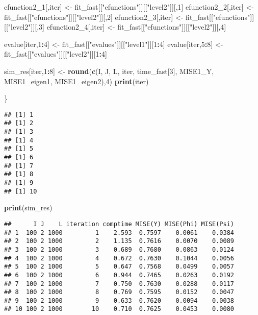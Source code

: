 \documentclass[
]{article}
\newenvironment{Shaded}{\begin{snugshade}}{\end{snugshade}}
\newcommand{\DecValTok}[1]{\textcolor[rgb]{0.00,0.00,0.81}{#1}}
\newcommand{\FunctionTok}[1]{\textcolor[rgb]{0.13,0.29,0.53}{\textbf{#1}}}
\newcommand{\NormalTok}[1]{#1}
\newcommand{\OtherTok}[1]{\textcolor[rgb]{0.56,0.35,0.01}{#1}}
\newcommand{\SpecialCharTok}[1]{\textcolor[rgb]{0.81,0.36,0.00}{\textbf{#1}}}
\newcommand{\StringTok}[1]{\textcolor[rgb]{0.31,0.60,0.02}{#1}}
\begin{document}
\begin{Shaded}
\begin{Highlighting}[]
\NormalTok{  efunction2\_1[,iter] }\OtherTok{\textless{}{-}}\NormalTok{ fit\_fast[[}\StringTok{"efunctions"}\NormalTok{]][[}\StringTok{"level2"}\NormalTok{]][,}\DecValTok{1}\NormalTok{]}
\NormalTok{  efunction2\_2[,iter] }\OtherTok{\textless{}{-}}\NormalTok{ fit\_fast[[}\StringTok{"efunctions"}\NormalTok{]][[}\StringTok{"level2"}\NormalTok{]][,}\DecValTok{2}\NormalTok{]}
\NormalTok{  efunction2\_3[,iter] }\OtherTok{\textless{}{-}}\NormalTok{ fit\_fast[[}\StringTok{"efunctions"}\NormalTok{]][[}\StringTok{"level2"}\NormalTok{]][,}\DecValTok{3}\NormalTok{]}
\NormalTok{  efunction2\_4[,iter] }\OtherTok{\textless{}{-}}\NormalTok{ fit\_fast[[}\StringTok{"efunctions"}\NormalTok{]][[}\StringTok{"level2"}\NormalTok{]][,}\DecValTok{4}\NormalTok{]}
  
\NormalTok{  evalue[iter,}\DecValTok{1}\SpecialCharTok{:}\DecValTok{4}\NormalTok{] }\OtherTok{\textless{}{-}}\NormalTok{ fit\_fast[[}\StringTok{"evalues"}\NormalTok{]][[}\StringTok{"level1"}\NormalTok{]][}\DecValTok{1}\SpecialCharTok{:}\DecValTok{4}\NormalTok{]}
\NormalTok{  evalue[iter,}\DecValTok{5}\SpecialCharTok{:}\DecValTok{8}\NormalTok{] }\OtherTok{\textless{}{-}}\NormalTok{ fit\_fast[[}\StringTok{"evalues"}\NormalTok{]][[}\StringTok{"level2"}\NormalTok{]][}\DecValTok{1}\SpecialCharTok{:}\DecValTok{4}\NormalTok{]}
 
\NormalTok{  sim\_res[iter,}\DecValTok{1}\SpecialCharTok{:}\DecValTok{8}\NormalTok{] }\OtherTok{\textless{}{-}} \FunctionTok{round}\NormalTok{(}\FunctionTok{c}\NormalTok{(I, J, L, iter, time\_fast[}\DecValTok{3}\NormalTok{], MISE1\_Y, MISE1\_eigen1, MISE1\_eigen2),}\DecValTok{4}\NormalTok{)}
  \FunctionTok{print}\NormalTok{(iter)}
  
\NormalTok{\}}
\end{Highlighting}
\end{Shaded}

\begin{verbatim}
## [1] 1
## [1] 2
## [1] 3
## [1] 4
## [1] 5
## [1] 6
## [1] 7
## [1] 8
## [1] 9
## [1] 10
\end{verbatim}

\begin{Shaded}
\begin{Highlighting}[]
  \FunctionTok{print}\NormalTok{(sim\_res)}
\end{Highlighting}
\end{Shaded}

\begin{verbatim}
##      I J    L iteration comptime MISE(Y) MISE(Phi) MISE(Psi)
## 1  100 2 1000         1    2.593  0.7597    0.0061    0.0384
## 2  100 2 1000         2    1.135  0.7616    0.0070    0.0089
## 3  100 2 1000         3    0.689  0.7680    0.0863    0.0124
## 4  100 2 1000         4    0.672  0.7630    0.1044    0.0056
## 5  100 2 1000         5    0.647  0.7568    0.0499    0.0057
## 6  100 2 1000         6    0.944  0.7465    0.0263    0.0192
## 7  100 2 1000         7    0.750  0.7630    0.0288    0.0117
## 8  100 2 1000         8    0.769  0.7595    0.0152    0.0047
## 9  100 2 1000         9    0.633  0.7620    0.0094    0.0038
## 10 100 2 1000        10    0.710  0.7625    0.0453    0.0080
\end{verbatim}
\end{document}
